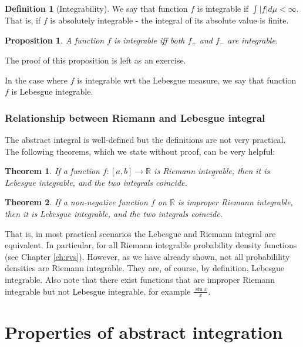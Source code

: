 \documentclass{book}
\theoremstyle{plain}%
\newtheorem{theorem}{Theorem}[section]
\newtheorem{proposition}{Proposition}[section]
\theoremstyle{definition}
\newtheorem{definition}{Definition}[section]
\newlength{\arrow}
\begin{document}
\begin{definition}[Integrability]
We say that function $f$ is integrable if $\int |f| d\mu <  \infty$. That is, if $f$ is absolutely integrable - the integral of its absolute value is finite.
\end{definition}

\begin{proposition} A function $f$ is integrable iff both $f_+$ and $f_-$ are integrable.\label{prop:integrable}
\end{proposition}

The proof of this proposition is left as an exercise.

In the case where $f$ is integrable wrt the Lebesgue measure, we say that function $f$ is Lebesgue integrable.

\subsubsection*{Relationship between Riemann and Lebesgue integral}

The abstract integral is well-defined but the definitions are not very practical. The following theorems, which we state without proof, can be very helpful:

\begin{theorem}
If a function $f : [a, b] \rightarrow \mathbb{R}$ is Riemann integrable, then it is Lebesgue integrable, and the two integrals coincide.
\end{theorem}

\begin{theorem}
If a non-negative function $f$ on $\mathbb{R}$ is improper Riemann integrable, then it is Lebesgue integrable, and the two integrals coincide.
\end{theorem}

That is, in most practical scenarios the Lebesgue and Riemann integral are equivalent. In particular, for all Riemann integrable probability density functions (see Chapter \ref{ch:rvs}). However, as we have already shown, not all probabilility densities are Riemann integrable. They are, of course, by definition, Lebesgue integrable. Also note that there exist functions that are improper Riemann integrable but not Lebesgue integrable, for example $\frac{\sin x}{x}$.

\section{Properties of abstract integration}
\end{document}
